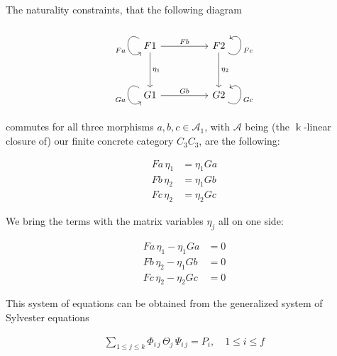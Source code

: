 \begin{example}
The naturality constraints, that the following diagram

\[
\begin{tikzcd}
F1 \arrow["Fa"', loop, distance=2em, in=215, out=145] \arrow[rr, "Fb"] \arrow[dd, "\eta_{1}"] &  & F2 \arrow["Fc"', loop, distance=2em, in=35, out=325] \arrow[dd, "\eta_{2}"] \\
                                                                                              &  &                                                                             \\
G1 \arrow["Ga"', loop, distance=2em, in=215, out=145] \arrow[rr, "Gb"]                        &  & G2 \arrow["Gc"', loop, distance=2em, in=35, out=325]                       
\end{tikzcd}
\]
commutes for all three morphisms $a, b, c \in \mathcal{A}_{1}$, with $\mathcal{A}$ being (the $\Bbbk$-linear closure of) our
finite concrete category $C_{3}C_{3}$, are the following:

\begin{subequations}\label{eq:naturality_constraints_c3c3}
\begin{align}
Fa\,\eta_{1} &= \eta_{1} Ga \\
Fb\,\eta_{2} &= \eta_{1} Gb \\
Fc\,\eta_{2} &= \eta_{2} Gc
\end{align}
\end{subequations}

We bring the terms with the matrix variables $\eta_{j}$ all on one side:

\begin{subequations}
\begin{align}
Fa\,\eta_{1} - \eta_{1} Ga &= 0 \\
Fb\,\eta_{2} - \eta_{1} Gb &= 0 \\
Fc\,\eta_{2} - \eta_{2} Gc &= 0
\end{align}
\end{subequations}

This system of equations can be obtained from the generalized system of Sylvester equations

\begin{align}\label{eq:general_sylvester_equations}
\sum_{1\leq j \leq k} \Phi_{i\,j}\, \Theta_{j}\, \Psi_{i\,j} = P_{i}, \quad 1\leq i \leq f
\end{align}


\end{example}
